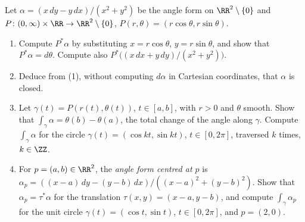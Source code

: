 \begin{exercise}\label{differential-forms:exercise-angle-form-polar}
Let $\alpha = (x\,dy - y\,dx)/(x^2 + y^2)$ be the angle form on $\RR^2 \setminus \{0\}$ and $P \colon (0, \infty) \times \RR \to \RR^2 \setminus \{0\}$, $P(r, \theta) = (r\cos\theta, r\sin\theta)$.
\begin{enumerate}
\item Compute $P^*\alpha$ by substituting $x = r\cos\theta$, $y = r\sin\theta$, and show that $P^*\alpha = d\theta$. Compute also $P^*\bigl((x\,dx + y\,dy)/(x^2 + y^2)\bigr)$.
\item Deduce from (1), without computing $d\alpha$ in Cartesian coordinates, that $\alpha$ is closed.
\item Let $\gamma(t) = P(r(t), \theta(t))$, $t \in [a, b]$, with $r > 0$ and $\theta$ smooth. Show that $\int_\gamma\alpha = \theta(b) - \theta(a)$, the total change of the angle along $\gamma$. Compute $\int_\gamma\alpha$ for the circle
$\gamma(t) = (\cos kt, \sin kt)$, $t \in [0, 2\pi]$, traversed $k$ times, $k \in \ZZ$.
\item For $p = (a, b) \in \RR^2$, the \emph{angle form centred at $p$} is $\alpha_p = ((x - a)\,dy - (y - b)\,dx)/((x - a)^2 + (y - b)^2)$. Show that $\alpha_p = \tau^*\alpha$ for the translation $\tau(x, y) = (x - a, y - b)$, and compute
$\int_\gamma\alpha_p$ for the unit circle $\gamma(t) = (\cos t, \sin t)$, $t \in [0, 2\pi]$, and $p = (2, 0)$.
\end{enumerate}
\end{exercise}

